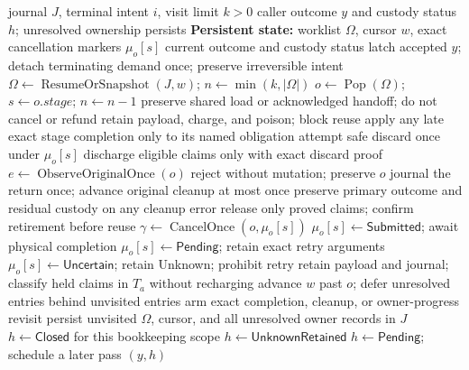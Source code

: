\begin{algorithm}[!htbp]
\caption{One bounded terminal-custody pass}
\label{alg:terminal-custody}
\fontsize{9}{9.6}\selectfont
\begin{algorithmic}[1]
\REQUIRE journal $J$, terminal intent $i$, visit limit $k>0$
\ENSURE caller outcome $y$ and custody status $h$; unresolved ownership persists
\STATE \textbf{Persistent state:} worklist $\Omega$, cursor $w$, exact cancellation markers $\mu_o[s]$
  \RETURN current outcome and custody status
\ENDIF
\STATE latch accepted $y$; detach terminating demand once; preserve irreversible intent
\STATE $\Omega\gets\operatorname{ResumeOrSnapshot}(J,w)$; $n\gets\min(k,|\Omega|)$
  \STATE $o\gets\operatorname{Pop}(\Omega)$; $s\gets o.\mathit{stage}$; $n\gets n-1$
    \STATE preserve shared load or acknowledged handoff; do not cancel or refund
    \STATE retain payload, charge, and poison; block reuse
    \STATE apply any late exact stage completion only to its named obligation
    \STATE attempt safe discard once under $\mu_o[s]$
    \STATE discharge eligible claims only with exact discard proof
  \ELSE
    \STATE $e\gets\operatorname{ObserveOriginalOnce}(o)$
      \STATE reject without mutation; preserve $o$
      \STATE journal the return once; advance original cleanup at most once
      \STATE preserve primary outcome and residual custody on any cleanup error
      \STATE release only proved claims; confirm retirement before reuse
        \STATE $\gamma\gets\operatorname{CancelOnce}(o,\mu_o[s])$
          \STATE $\mu_o[s]\gets\mathsf{Submitted}$; await physical completion
          \STATE $\mu_o[s]\gets\mathsf{Pending}$; retain exact retry arguments
        \ELSE
          \STATE $\mu_o[s]\gets\mathsf{Uncertain}$; retain Unknown; prohibit retry
        \ENDIF
      \ENDIF
    \ELSE
      \STATE retain payload and journal; classify held claims in $T_a$ without recharging
    \ENDIF
  \ENDIF
  \STATE advance $w$ past $o$; defer unresolved entries behind unvisited entries
  \STATE arm exact completion, cleanup, or owner-progress revisit
\ENDWHILE
\STATE persist unvisited $\Omega$, cursor, and all unresolved owner records in $J$
  \STATE $h\gets\mathsf{Closed}$ for this bookkeeping scope
  \STATE $h\gets\mathsf{UnknownRetained}$
\ELSE
  \STATE $h\gets\mathsf{Pending}$; schedule a later pass
\ENDIF
\RETURN $(y,h)$
\end{algorithmic}
\end{algorithm}


